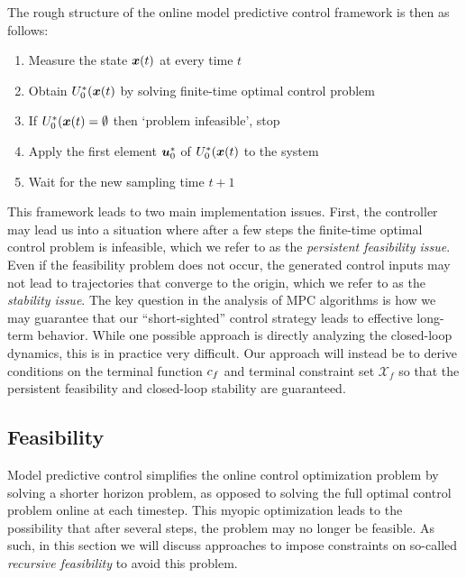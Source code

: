 The rough structure of the online model predictive control framework is then as follows:
\begin{enumerate}
    \item Measure the state $\bm{x}(t)$ at every time $t$
    \item Obtain $U^*_0(\bm{x}(t)$ by solving finite-time optimal control problem
    \item If $U^*_0(\bm{x}(t) = \emptyset$ then `problem infeasible', stop
    \item Apply the first element $\bm{u}^*_0$ of $U^*_0(\bm{x}(t)$ to the system
    \item Wait for the new sampling time $t+1$
\end{enumerate}
This framework leads to two main implementation issues. First, the controller may lead us into a situation where after a few steps the finite-time optimal control problem is infeasible, which we refer to as the \textit{persistent feasibility issue}. Even if the feasibility problem does not occur, the generated control inputs may not lead to trajectories that converge to the origin, which we refer to as the \textit{stability issue}. The key question in the analysis of MPC algorithms is how we may guarantee that our ``short-sighted'' control strategy leads to effective long-term behavior. While one possible approach is directly analyzing the closed-loop dynamics, this is in practice very difficult. Our approach will instead be to derive conditions on the terminal function $c_f$ and terminal constraint set $\mathcal{X}_f$ so that the persistent feasibility and closed-loop stability are guaranteed. 

\subsection{Feasibility}

Model predictive control simplifies the online control optimization problem by solving a shorter horizon problem, as opposed to solving the full optimal control problem online at each timestep. This myopic optimization leads to the possibility that after several steps, the problem may no longer be feasible. As such, in this section we will discuss approaches to impose constraints on so-called \textit{recursive feasibility} to avoid this problem. 


